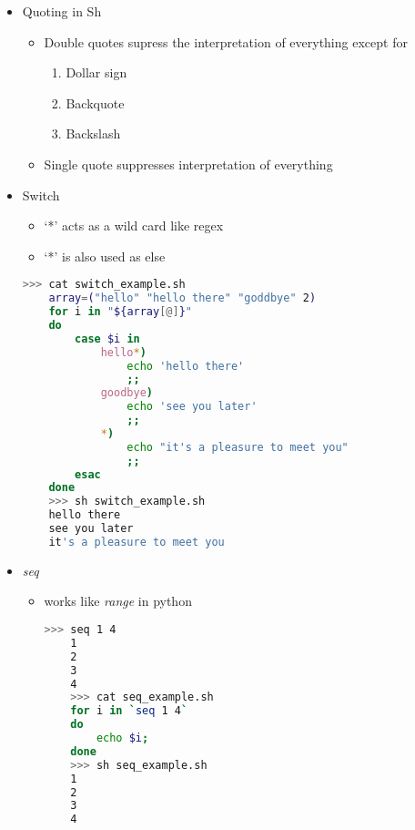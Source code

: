 \documentclass[12pt]{article}
\begin{document}
\begin{itemize}
    \item Quoting in Sh
    \begin{itemize}
        \item Double quotes supress the interpretation of everything except for

        \begin{enumerate}[1.]
        \item Dollar sign
        \item Backquote
        \item Backslash
        \end{enumerate}

        \item Single quote suppresses interpretation of everything
    \end{itemize}

    \item Switch
    \begin{itemize}
        \item `*' acts as a wild card like regex
        \item `*' is also used as else
    \end{itemize}

    \begin{lstlisting}[language=bash]
    >>> cat switch_example.sh
    array=("hello" "hello there" "goddbye" 2)
    for i in "${array[@]}"
    do
        case $i in
            hello*)
                echo 'hello there'
                ;;
            goodbye)
                echo 'see you later'
                ;;
            *)
                echo "it's a pleasure to meet you"
                ;;
        esac
    done
    >>> sh switch_example.sh
    hello there
    see you later
    it's a pleasure to meet you
    \end{lstlisting}

    \item \textit{seq}

    \begin{itemize}
    \item works like \textit{range} in python

    \begin{lstlisting}[language=bash]
    >>> seq 1 4
    1
    2
    3
    4
    >>> cat seq_example.sh
    for i in `seq 1 4`
    do
        echo $i;
    done
    >>> sh seq_example.sh
    1
    2
    3
    4
    \end{lstlisting}

    \end{itemize}
\end{itemize}
\end{document}
